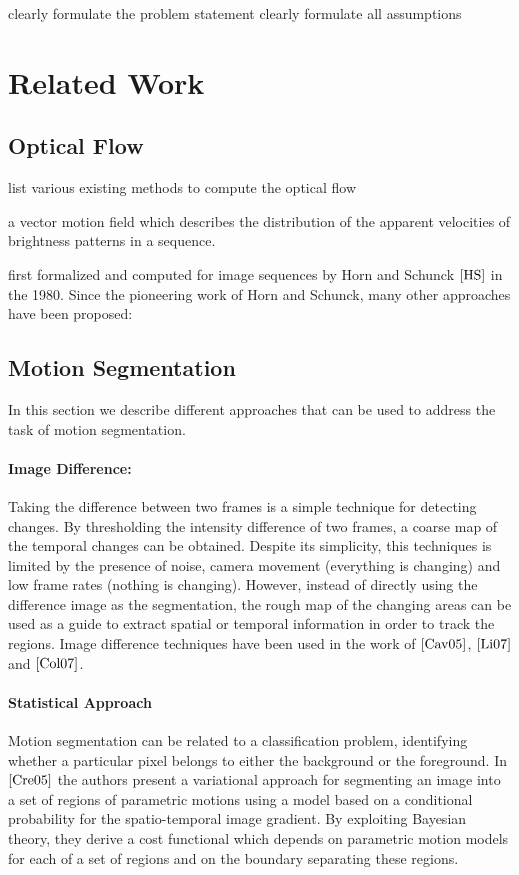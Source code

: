 clearly formulate the problem statement
clearly formulate all assumptions

\section{Related Work}

\subsection{Optical Flow}
list various existing methods to compute the optical flow

a vector motion field which describes the distribution of the apparent velocities of brightness patterns in a sequence. 

first formalized and computed  for  image  sequences  by  Horn  and  Schunck $\cite{HS}$ in  the  1980. Since the pioneering work of Horn and Schunck, many other approaches have been proposed:

\subsection{Motion Segmentation}
In this section we describe different approaches that can be used to address the task of motion segmentation.

\paragraph{Image Difference:} Taking the difference between two frames is a simple technique for detecting changes. By thresholding the intensity difference of two frames, a coarse map of the temporal changes can be obtained. Despite its simplicity, this techniques is limited by the presence of noise, camera movement (everything is changing) and low frame rates (nothing is changing). However, instead of directly using the difference image as the segmentation, the rough map of the changing areas can be used as a guide to extract spatial or temporal information in order to track the regions. Image difference techniques have been used in the work of $\cite{Cav05}$, $\cite{Li07}$ and $\cite{Col07}$.

\paragraph{Statistical Approach} Motion segmentation can be related to a classification problem, identifying whether a particular pixel belongs to either the background or the foreground. In $\cite{Cre05}$ the authors present a variational approach for segmenting an image into a set of regions of parametric motions using a model based on a conditional probability for the spatio-temporal image gradient. By exploiting Bayesian theory, they derive a cost functional which depends on parametric motion models for each  of a set of regions and on the boundary separating these regions.

